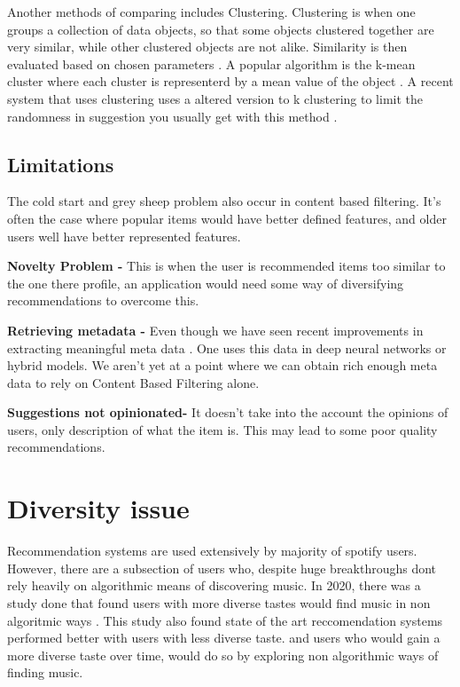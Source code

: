 Another methods of comparing includes Clustering. Clustering is when one  groups a collection of data objects, so that some objects clustered together are very similar, while other clustered objects are not alike. Similarity is then evaluated based on chosen parameters \citep{ferretti_clustering_2018}. A popular algorithm is the k-mean cluster where each cluster is representerd by a mean value of the object \citep{han_data_2006}. A recent system that uses clustering uses a altered version to k clustering to limit the randomness in suggestion you usually get with this method \citep{chang_personalized_2017}.



\subsection{Limitations}
The cold start and grey sheep problem also occur in content based filtering. It's often the case where popular items would have better defined features, and older users well have better represented features.

\textbf{Novelty Problem - } This is when the user is recommended items too similar to the one there profile, an application would need some way of diversifying recommendations to overcome this.

\textbf{Retrieving metadata - } Even though we have seen recent improvements in extracting meaningful meta data \citep{vall_feature-combination_2019} \citep{singh_novel_2022}. One uses this data in deep neural networks or hybrid models. We aren't yet at a point where we can obtain rich enough meta data to rely on Content Based Filtering alone.

\textbf{Suggestions not opinionated- } It doesn't take into the account the opinions of users, only description of what the item is. This may lead to some poor quality recommendations.  


\section{Diversity issue}

Recommendation systems are used extensively by majority of spotify users. However, there are a subsection of users who, despite huge breakthroughs dont rely heavily on algorithmic means of discovering music. In 2020, there was a study done that found users with more diverse tastes would find music in non algoritmic ways \citep{anderson_algorithmic_2020}. This study also found state of the art reccomendation systems performed better with users with less diverse taste. and users who would gain a more diverse taste over time, would do so by exploring non algorithmic ways of finding music.

